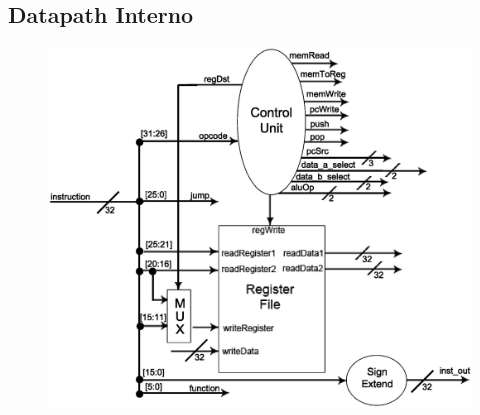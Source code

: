 \begin{center}
\begin{longtable}[pos]{| c | c | c | c | c | c | c | c | c | c | c | c | c | c | c | c |}
		\end{longtable}
	\end{center}
   
   \newpage
	
	\subsection{Datapath Interno}
	
	\begin{figure}[h!]
		\begin{center}
		\includegraphics[scale=0.8]{./datapath/stage2.eps}
		\end{center}
	\end{figure}
